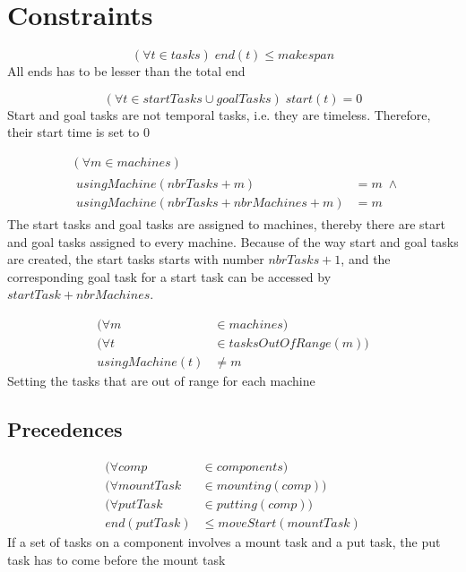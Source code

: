\documentclass[10pt,a4paper]{report}
\begin{document}
\section*{Constraints}

\begin{equation}\label{eq:92}
(\forall t \in tasks) \; end(t) \le makespan
\end{equation}
All ends has to be lesser than the total end

\begin{equation}\label{eq:93}
(\forall t \in startTasks \cup goalTasks) \; start(t) = 0
\end{equation}
Start and goal tasks are not temporal tasks, i.e. they are timeless. Therefore, their start time is set to 0


\begin{equation}
\begin{aligned}\label{eq:94}
&(\forall m \in machines) \\
&\begin{aligned}
usingMachine(nbrTasks + m) &= m \; \land\\
usingMachine(nbrTasks + nbrMachines + m) &= m
\end{aligned}
\end{aligned}
\end{equation}
The start tasks and goal tasks are assigned to machines, thereby there are start and goal tasks assigned to every machine. Because of the way start and goal tasks are created, the start tasks starts with number $nbrTasks + 1$, and the corresponding goal task for a start task can be accessed by $startTask + nbrMachines$.

\begin{equation}\label{eq:95}
\begin{aligned}
(\forall m &\in machines) \\
(\forall t &\in tasksOutOfRange(m)) \\
usingMachine(t) &\neq m
\end{aligned}
\end{equation}
Setting the tasks that are out of range for each machine

\subsection*{Precedences}

\begin{equation}
\begin{aligned}\label{eq:96}
(\forall comp &\in components) \\
(\forall mountTask &\in mounting(comp)) \\
(\forall putTask &\in putting(comp)) \\
end(putTask) &\le moveStart(mountTask)
\end{aligned}
\end{equation}
If a set of tasks on a component involves a mount task and a put task, the put task has to come before the mount task
\end{document}
